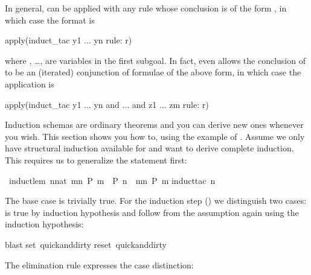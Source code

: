\begin{isabelle}
\begin{isamarkuptext}
In general,  can be applied with any rule 
whose conclusion is of the form , in which case the
format is
\begin{ttbox}
apply(induct_tac y1 ... yn rule: r)
\end{ttbox}%
where , \dots,  are variables in the first subgoal.
In fact,  even allows the conclusion of
 to be an (iterated) conjunction of formulae of the above form, in
which case the application is
\begin{ttbox}
apply(induct_tac y1 ... yn and ... and z1 ... zm rule: r)
\end{ttbox}%
\end{isamarkuptext}%
%
%
\begin{isamarkuptext}%
\label{sec:derive-ind}
Induction schemas are ordinary theorems and you can derive new ones
whenever you wish.  This section shows you how to, using the example
of . Assume we only have structural induction
available for  and want to derive complete induction. This
requires us to generalize the statement first:%
\end{isamarkuptext}%
\ induct{\isacharunderscore}lem{\isacharcolon}\ {\isachardoublequote}{\isacharparenleft}{\isasymAnd}n{\isacharcolon}{\isacharcolon}nat{\isachardot}\ {\isasymforall}m{\isacharless}n{\isachardot}\ P\ m\ {\isasymLongrightarrow}\ P\ n{\isacharparenright}\ {\isacharequal}{\isacharequal}{\isachargreater}\ {\isasymforall}m{\isacharless}n{\isachardot}\ P\ m{\isachardoublequote}\isanewline
{}induct{\isacharunderscore}tac\ n{\isacharparenright}%
\begin{isamarkuptxt}%
\noindent
The base case is trivially true. For the induction step () we distinguish two cases:  is true by induction
hypothesis and  follow from the assumption again using
the induction hypothesis:%
\end{isamarkuptxt}%
blast{\isacharparenright}\isanewline
\isanewline
{}set\ quick{\isacharunderscore}and{\isacharunderscore}dirty{\isachardoublequote}\isanewline
{}\isanewline
{}reset\ quick{\isacharunderscore}and{\isacharunderscore}dirty{\isachardoublequote}%
\begin{isamarkuptext}%
\noindent
The elimination rule  expresses the case distinction:
\begin{quote}


\end{quote}
\end{isamarkuptext}
\end{isabelle}
